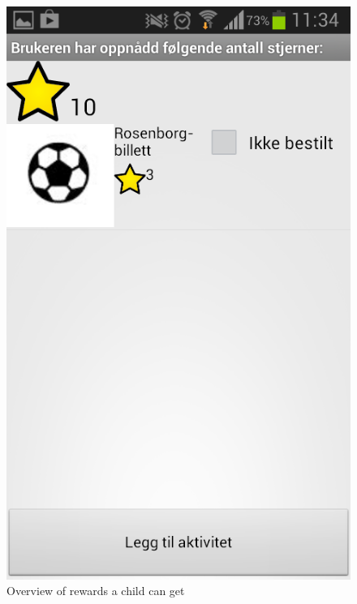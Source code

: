 \begin{figure}
\begin{minipage}[t]{0.4\linewidth}
			\includegraphics[width=0.20\paperwidth]{Pictures/new-screenshots/award.png}
		\caption{Overview of rewards a child can get}
		\label{fig:parent-awards}
	\end{minipage}
\end{figure}

